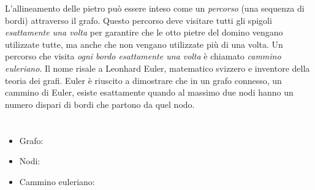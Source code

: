 {{L’allineamento delle pietro può essere inteso come un \emph{percorso} (una sequenza di bordi) attraverso il grafo. Questo percorso deve visitare tutti gli spigoli \emph{esattamente una volta} per garantire che le otto pietre del domino vengano utilizzate tutte, ma anche che non vengano utilizzate più di una volta.  Un percorso che visita \emph{ogni bordo esattamente una volta} è chiamato \emph{cammino euleriano}. Il nome risale a Leonhard Euler, matematico svizzero e inventore della teoria dei grafi. Euler  è riuscito a dimostrare che in un grafo connesso, un cammino di Euler, esiste esattamente quando al massimo due nodi hanno un numero dispari di bordi che partono da quel nodo.



\section*{\BrochureWebsitesAndKeywords}
{\raggedright
\begin{itemize}
  \item Grafo: \href{https://it.wikipedia.org/wiki/Teoria_dei_grafi}{}
  \item Nodi: \href{https://it.wikipedia.org/wiki/Vertice_(teoria_dei_grafi)}{}
  \item Cammino euleriano: \href{https://it.wikipedia.org/wiki/Cammino_euleriano}{}
\end{itemize}


}

}{}

\def\AuthorStaubJ{} %
\def\AuthorChothiaZ{} %
\def\AuthorDatzkoThutS{} %
\def\AuthorEscherleN{} %
\def\AuthorPohlW{} %
\def\AuthorGiangC{} %

\newpage}{}
